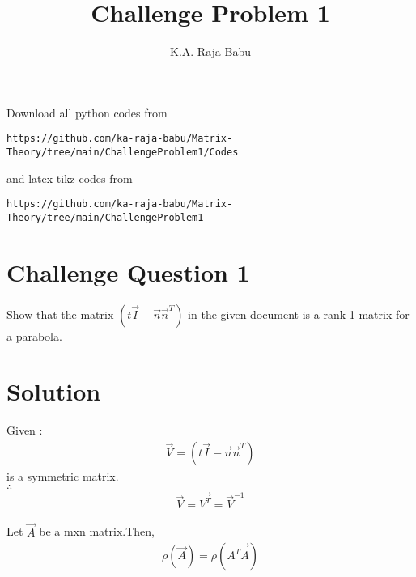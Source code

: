 \documentclass[journal,12pt,twocolumn]{IEEEtran}
\begin{document}
     \def\rightbox#1{\makebox[0in][r]{#1}}
     \def\centbox#1{\makebox[0in]{#1}}
     \def\topbox#1{\raisebox{-\baselineskip}[0in][0in]{#1}}
     \def\midbox#1{\raisebox{-0.5\baselineskip}[0in][0in]{#1}}
\vspace{3cm}
\title{Challenge Problem 1}
\author{K.A. Raja Babu}
\maketitle
\newpage
\bigskip
\renewcommand{\thefigure}{\theenumi}
\renewcommand{\thetable}{\theenumi}
Download all python codes from 
\begin{lstlisting}
https://github.com/ka-raja-babu/Matrix-Theory/tree/main/ChallengeProblem1/Codes
\end{lstlisting}
%
and latex-tikz codes from 
%
\begin{lstlisting}
https://github.com/ka-raja-babu/Matrix-Theory/tree/main/ChallengeProblem1
\end{lstlisting}
%
\section{Challenge Question 1}
Show that the matrix $(t\vec{I}-\vec{n}\vec{n}^T)$ in the given document is a rank 1 matrix for a parabola.
%
\section{Solution}
Given :
\begin{align}
    \vec{V} = (t\vec{I}-\vec{n}\vec{n}^T) 
\end{align}
is a symmetric matrix.
\\
$\therefore$
\begin{align}
    \vec{V} = \vec{V^T} = \vec{V}^{-1} \label{eq2}
\end{align}


\begin{lemma}
Let $\vec{A}$ be a mxn matrix.Then,
\begin{align}
   \rho(\vec{A}) = \rho(\vec{A^TA}) \label{eq1}
\end{align}
\end{lemma}
\end{document}
